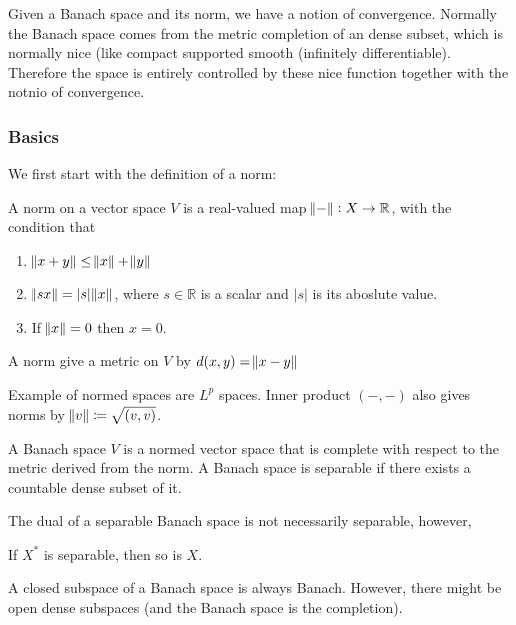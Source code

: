 \documentclass[main.tex]{subfiles}
\begin{document}
\begin{remark}
Given a Banach space and its norm, we have a notion of convergence. Normally the Banach space comes from the metric completion of an dense subset, which is normally nice (like compact supported smooth (infinitely differentiable). Therefore the space is entirely controlled by these nice function together with the notnio of convergence.
\end{remark}

\subsubsection{Basics}

We first start with the definition of a norm:

\begin{definition}
A norm on a vector space $V$ is a real-valued map $\norm{-} : X \rightarrow \mathbb{R}$, with the condition that 
\begin{enumerate}
    \item $\norm{x + y} \leq \norm{x} + \norm{y}$
    \item $\norm{s x} = |s| \norm{x}$, where $s \in \mathbb{R}$ is a scalar and $|s|$ is its aboslute value.
    \item If $\norm{x} = 0$ then $x = 0$.
\end{enumerate}

A norm give a metric on $V$ by $d(x, y) = \norm{x -y}$
\end{definition}

\begin{example}
Example of normed spaces are $L^p$ spaces. Inner product $(-,-)$ also gives norms by $\norm{v} \coloneqq \sqrt{(v,v)}$. 
\end{example}


\begin{definition}
A Banach space $V$ is a normed vector space that is complete with respect to the metric derived from the norm. A Banach space is separable if there exists a countable dense subset of it.
\end{definition}

The dual of a separable Banach space is not necessarily separable, however, 

\begin{proposition}
If $X^*$ is separable, then so is $X$.
\end{proposition}


A closed subspace of a Banach space is always Banach. However, there might be open dense subspaces (and the Banach space is the completion).
\end{document}
